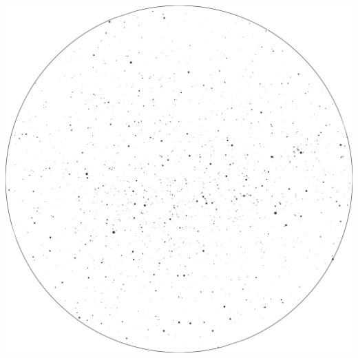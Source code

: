 \documentclass{./SAS-class-skygen}
\begin{document}
	\vspace{0.5cm}
    \begin{center}
    \includegraphics[width=\textwidth]{./pics/skychart13.png}
    \end{center}
    
    
\end{document}
